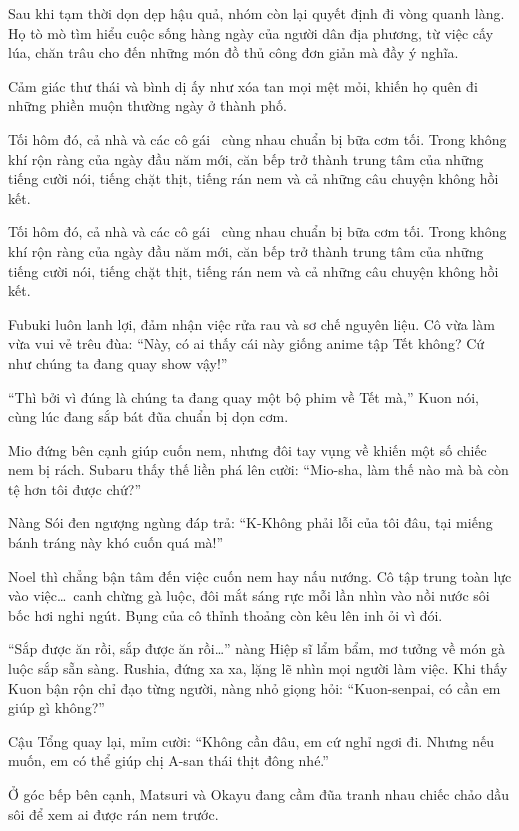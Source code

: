 \documentclass[../main.tex]{subfiles}
\begin{document}
Sau khi tạm thời dọn dẹp hậu quả, nhóm còn lại quyết định đi vòng quanh làng. Họ tò mò tìm hiểu cuộc sống hàng ngày của người dân địa phương, từ việc cấy lúa, chăn trâu cho đến những món đồ thủ công đơn giản mà đầy ý nghĩa.

Cảm giác thư thái và bình dị ấy như xóa tan mọi mệt mỏi, khiến họ quên đi những phiền muộn thường ngày ở thành phố.

Tối hôm đó, cả nhà và các cô gái \hll\ cùng nhau chuẩn bị bữa cơm tối. Trong không khí rộn ràng của ngày đầu năm mới, căn bếp trở thành trung tâm của những tiếng cười nói, tiếng chặt thịt, tiếng rán nem và cả những câu chuyện không hồi kết.

\ct

Tối hôm đó, cả nhà và các cô gái \hll\ cùng nhau chuẩn bị bữa cơm tối. Trong không khí rộn ràng của ngày đầu năm mới, căn bếp trở thành trung tâm của những tiếng cười nói, tiếng chặt thịt, tiếng rán nem và cả những câu chuyện không hồi kết.

Fubuki luôn lanh lợi, đảm nhận việc rửa rau và sơ chế nguyên liệu. Cô vừa làm vừa vui vẻ trêu đùa: ``Này, có ai thấy cái này giống anime tập Tết không? Cứ như chúng ta đang quay show vậy!''

``Thì bởi vì đúng là chúng ta đang quay một bộ phim về Tết mà,'' Kuon nói, cùng lúc đang sắp bát đũa chuẩn bị dọn cơm.

Mio đứng bên cạnh giúp cuốn nem, nhưng đôi tay vụng về khiến một số chiếc nem bị rách. Subaru thấy thế liền phá lên cười: ``Mio-sha, làm thế nào mà bà còn tệ hơn tôi được chứ?''

Nàng Sói đen ngượng ngùng đáp trả: ``K-Không phải lỗi của tôi đâu, tại miếng bánh tráng này khó cuốn quá mà!''

Noel thì chẳng bận tâm đến việc cuốn nem hay nấu nướng. Cô tập trung toàn lực vào việc\dots\ canh chừng gà luộc, đôi mắt sáng rực mỗi lần nhìn vào nồi nước sôi bốc hơi nghi ngút. Bụng của cô thỉnh thoảng còn kêu lên inh ỏi vì đói.

``Sắp được ăn rồi, sắp được ăn rồi\dots'' nàng Hiệp sĩ lẩm bẩm, mơ tưởng về món gà luộc sắp sẵn sàng. Rushia, đứng xa xa, lặng lẽ nhìn mọi người làm việc. Khi thấy Kuon bận rộn chỉ đạo từng người, nàng nhỏ giọng hỏi: ``Kuon-senpai, có cần em giúp gì không?''

Cậu Tổng quay lại, mỉm cười: ``Không cần đâu, em cứ nghỉ ngơi đi. Nhưng nếu muốn, em có thể giúp chị A-san thái thịt đông nhé.''

Ở góc bếp bên cạnh, Matsuri và Okayu đang cầm đũa tranh nhau chiếc chảo dầu sôi để xem ai được rán nem trước.
\end{document}
